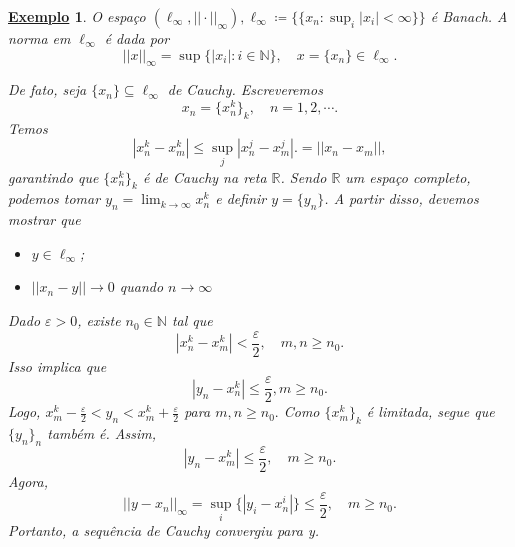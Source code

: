 \documentclass{article}
\newtheorem{example}{\underline{Exemplo}}
\begin{document}
\begin{example}
  O espaço \((\ell_{\infty}, ||\cdot ||_{\infty}), \ell_{\infty}\coloneqq \biggl\{\{x_{n}:\sup_{i}|x_{i}|<\infty\}\biggr\}\) é Banach. A norma em \(\ell_{\infty}\) é dada por 
  \[
    ||x||_{\infty}=\sup\{|x_{i}|:i\in \mathbb{N}\},\quad x = \{x_{n}\}\in \ell_{\infty}.
  \]

  De fato, seja \(\{x_{n}\}\subseteq{\ell_{\infty}}\) de Cauchy. Escreveremos 
  \[
    x_{n} = \{x_{n}^{k}\}_{k}, \quad n = 1, 2, \cdots.
  \]
  Temos 
  \[
    |x_{n}^{k}-x_{m}^{k}|\leq \sup_{j}|x_{n}^{j}-x_{m}^{j} |. = ||x_{n}-x_{m}||,
  \]
garantindo que \(\{x_{n}^{k}\}_{k}\) é de Cauchy na reta \(\mathbb{R}\). Sendo \(\mathbb{R}\) um espaço completo, podemos tomar
 \(y_{n} = \lim_{k\to \infty}x_{n}^{k}\) e definir \(y = \{y_{n}\}\). A partir disso, devemos mostrar que 
\begin{itemize}
  \item[1)] \(y\in \ell_{\infty}\);
  \item[2)] \(||x_{n}-y||\longrightarrow 0\) quando \(n\longrightarrow\infty\)
\end{itemize}
  Dado \(\varepsilon > 0\), existe \(n_{0}\in \mathbb{N}\) tal que 
  \[
    |x_{n}^{k}-x_{m}^{k}| < \frac{\varepsilon }{2},\quad m,n\geq n_{0}.
  \]
  Isso implica que 
  \[
    |y_{n}-x_{n}^{k}|\leq \frac{\varepsilon }{2}, m\geq n_{0}.
  \]
  Logo, \(x_{m}^{k}-\frac{\varepsilon }{2} < y_{n} < x_{m}^{k}+\frac{\varepsilon }{2}\) para \(m, n\geq n_{0}.\) Como
  \(\{x_{m}^{k}\}_{k}\) é limitada, segue que \(\{y_{n}\}_{n}\) também é. Assim, 
  \[
    |y_{n}-x_{m}^{k}|\leq \frac{\varepsilon }{2},\quad m\geq n_{0}.
  \]
  Agora, 
  \[
    ||y-x_{n}||_{\infty}=\sup_{i}\{|y_{i}-x_{n}^{i}|\}\leq \frac{\varepsilon }{2},\quad m\geq n_{0}.
  \] 
  Portanto, a sequência de Cauchy convergiu para y.
\end{example}
\end{document}
